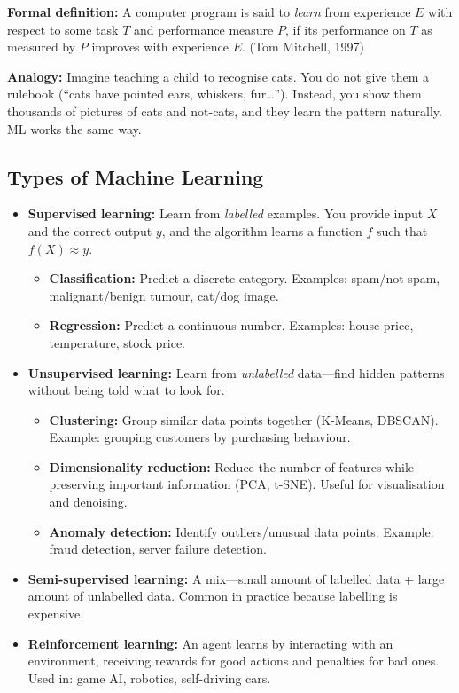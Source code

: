 \documentclass[12pt, a4paper, oneside]{book}
\begin{document}
\textbf{Formal definition:} A computer program is said to \emph{learn} from experience $E$ with respect to some task $T$ and performance measure $P$, if its performance on $T$ as measured by $P$ improves with experience $E$. (Tom Mitchell, 1997)

\textbf{Analogy:} Imagine teaching a child to recognise cats. You do not give them a rulebook (``cats have pointed ears, whiskers, fur\ldots''). Instead, you show them thousands of pictures of cats and not-cats, and they learn the pattern naturally. ML works the same way.

\subsection{Types of Machine Learning}

\begin{itemize}[leftmargin=2em]
    \item \textbf{Supervised learning:} Learn from \emph{labelled} examples. You provide input $X$ and the correct output $y$, and the algorithm learns a function $f$ such that $f(X) \approx y$.
    \begin{itemize}
        \item \textbf{Classification:} Predict a discrete category. Examples: spam/not spam, malignant/benign tumour, cat/dog image.
        \item \textbf{Regression:} Predict a continuous number. Examples: house price, temperature, stock price.
    \end{itemize}
    \item \textbf{Unsupervised learning:} Learn from \emph{unlabelled} data---find hidden patterns without being told what to look for.
    \begin{itemize}
        \item \textbf{Clustering:} Group similar data points together (K-Means, DBSCAN). Example: grouping customers by purchasing behaviour.
        \item \textbf{Dimensionality reduction:} Reduce the number of features while preserving important information (PCA, t-SNE). Useful for visualisation and denoising.
        \item \textbf{Anomaly detection:} Identify outliers/unusual data points. Example: fraud detection, server failure detection.
    \end{itemize}
    \item \textbf{Semi-supervised learning:} A mix---small amount of labelled data + large amount of unlabelled data. Common in practice because labelling is expensive.
    \item \textbf{Reinforcement learning:} An agent learns by interacting with an environment, receiving rewards for good actions and penalties for bad ones. Used in: game AI, robotics, self-driving cars.
\end{itemize}
\end{document}
